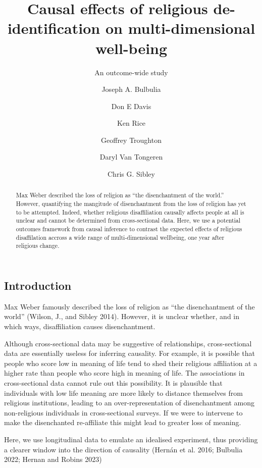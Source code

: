 \documentclass[
  letterpaper,
  DIV=11,
  numbers=noendperiod]{scrartcl}
\title{Causal effects of religious de-identification on
multi-dimensional well-being}
\subtitle{An outcome-wide study}
\author{Joseph A. Bulbulia \and Don E Davis \and Ken Rice \and Geoffrey
Troughton \and Daryl Van Tongeren \and Chris G. Sibley}
\date{}
\begin{document}
\maketitle
\begin{abstract}
Max Weber described the loss of religion as ``the disenchantment of the
world.'' However, quantifying the mangitude of disenchantment from the
loss of religion has yet to be attempted. Indeed, whether religious
disaffiliation causally affects people at all is unclear and cannot be
determined from cross-sectional data. Here, we use a potential outcomes
framework from causal inference to contrast the expected effects of
religious disaffilation accross a wide range of multi-dimensional
wellbeing, one year after religious change.
\end{abstract}
\ifdefined\Shaded\renewenvironment{Shaded}{\begin{tcolorbox}[interior hidden, frame hidden, borderline west={3pt}{0pt}{shadecolor}, breakable, enhanced, boxrule=0pt, sharp corners]}{\end{tcolorbox}}\fi

\hypertarget{introduction}{%
\subsection{Introduction}\label{introduction}}

Max Weber famously described the loss of religion as ``the
disenchantment of the world'' (Wilson, J., and Sibley 2014). However, it
is unclear whether, and in which ways, disaffiliation causes
disenchantment.

Although cross-sectional data may be suggestive of relationships,
cross-sectional data are essentially useless for inferring causality.
For example, it is possible that people who score low in meaning of life
tend to shed their religious affiliation at a higher rate than people
who score high in meaning of life. The associations in cross-sectional
data cannot rule out this possibility. It is plausible that individuals
with low life meaning are more likely to distance themselves from
religious institutions, leading to an over-representation of
disenchantment among non-religious individuals in cross-sectional
surveys. If we were to intervene to make the disenchanted re-affiliate
this might lead to greater loss of meaning.

Here, we use longitudinal data to emulate an idealised experiment, thus
providing a clearer window into the direction of causality (Hernán et
al. 2016; Bulbulia 2022; Hernan and Robins 2023)
\end{document}
